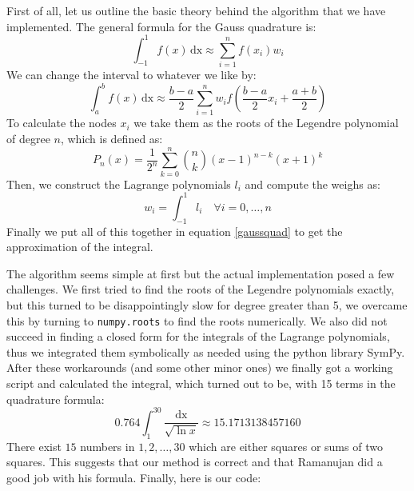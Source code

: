 \begin{solution}
  First of all, let us outline the basic theory behind the algorithm
  that we have implemented. The general formula for the Gauss
  quadrature is:
\begin{equation*}
\int_{-1}^1 f(x) \, \text{dx} \approx \sum_{i=1}^n f(x_i)w_i
\end{equation*}
We can change the interval to whatever we like by:
\begin{equation}
  \int_a^b f(x) \, \text{dx} \approx \frac{b-a}{2} \sum_{i=1}^n w_i f\left(\frac{b-a}{2}x_i+\frac{a+b}{2}\right)
\label{gaussquad}
\end{equation}
To calculate the nodes $x_i$ we take them as the roots of the Legendre
polynomial of degree $n$, which is defined as:
\begin{equation*}
P_n(x) = \frac{1}{2^n} \sum_{k=0}^n \binom{n}{k} (x-1)^{n-k}(x+1)^k
\end{equation*}
Then, we construct the Lagrange polynomials $l_i$ and compute the
weighs as:
\begin{equation*}
w_i = \int_{-1}^1 l_i \quad \forall i = 0, \ldots, n
\end{equation*}
Finally we put all of this together in equation \ref{gaussquad} to get
the approximation of the integral.

The algorithm seems simple at first but the actual implementation
posed a few challenges. We first tried to find the roots of the
Legendre polynomials exactly, but this turned to be disappointingly
slow for degree greater than 5, we overcame this by turning to
\texttt{numpy.roots} to find the roots numerically. We also did not
succeed in finding a closed form for the integrals of the Lagrange
polynomials, thus we integrated them symbolically as needed using the
python library SymPy. After these workarounds (and some other minor
ones) we finally got a working script and calculated the integral,
which turned out to be, with 15 terms in the quadrature formula:
\begin{equation*}
0.764 \int_1^{30} \frac{\text{dx}}{\sqrt{\ln x}} \approx 15.1713138457160
\end{equation*}
There exist $15$ numbers in $1, 2, \dots, 30$ which are either squares
or sums of two squares. This suggests that our method is correct and
that Ramanujan did a good job with his formula. Finally, here is our
code:

\end{solution}
\newpage


